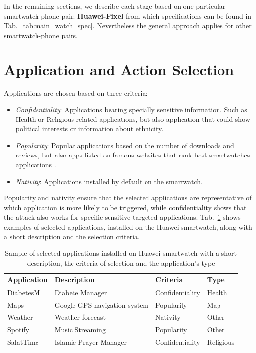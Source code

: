  In the remaining sections, we describe each stage based on one particular smartwatch-phone pair: \textbf{Huawei-Pixel} from which specifications can be found in Tab.~\ref{tab:main_watch_spec}. Nevertheless the general approach applies for other smartwatch-phone pairs. 



\section{Application and Action Selection}
\label{sec:application_and_action_selection}
Applications are chosen based on three criteria:

\begin{itemize}
  \item \textit{Confidentiality}: Applications bearing specially sensitive information. Such as Health or Religious related applications, but also application that could show political interests or information about ethnicity.
  \item \textit{Popularity}: Popular applications based on the number of downloads and reviews, but also apps listed on famous websites that rank best smartwatches applications \cite{bestWearOSApp, bestWearOSApp2}.
  \item \textit{Nativity}: Applications installed by default on the smartwatch.
  \end{itemize}
  
Popularity and nativity ensure that the selected applications are representative of which application is more likely to be triggered, while confidentiality shows that the attack also works for specific sensitive targeted applications. Tab.~\ref{tab:app_examples} shows examples of selected applications, installed on the Huawei smartwatch, along with a short description and the selection criteria.
\\


\begin{table}[h]
\centering
 \begin{tabular}{@{}llll@{}} 
 \toprule
 Application & Description & Criteria  & Type\\ [0.5ex] 
 \midrule
 DiabetesM & Diabete Manager & Confidentiality & Health \\ 

 Maps & Google GPS navigation system & Popularity & Map \\

 Weather & Weather forecast  & Nativity & Other \\

 Spotify & Music Streaming & Popularity  & Other \\

 SalatTime & Islamic Prayer Manager & Confidentiality & Religious \\ 
 \bottomrule

\end{tabular}
\caption{Sample of selected applications installed on Huawei smartwatch with a short description, the criteria of selection and the application's type}
    \label{tab:app_examples}
\end{table}


